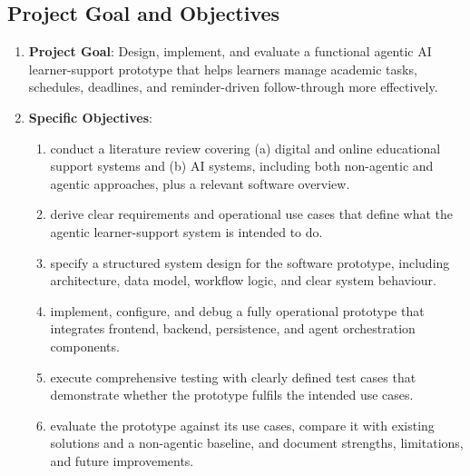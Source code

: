\documentclass[12pt]{article}
\begin{document}
\subsection{Project Goal and Objectives}
\begin{enumerate}
    \item \textbf{Project Goal}: Design, implement, and evaluate a functional agentic AI learner-support prototype that helps learners manage academic tasks, schedules, deadlines, and reminder-driven follow-through more effectively.
    \item \textbf{Specific Objectives}:
    \begin{enumerate}
        \item conduct a literature review covering (a) digital and online educational support systems and (b) AI systems, including both non-agentic and agentic approaches, plus a relevant software overview.
        \item derive clear requirements and operational use cases that define what the agentic learner-support system is intended to do.
        \item specify a structured system design for the software prototype, including architecture, data model, workflow logic, and clear system behaviour.
        \item implement, configure, and debug a fully operational prototype that integrates frontend, backend, persistence, and agent orchestration components.
        \item execute comprehensive testing with clearly defined test cases that demonstrate whether the prototype fulfils the intended use cases.
        \item evaluate the prototype against its use cases, compare it with existing solutions and a non-agentic baseline, and document strengths, limitations, and future improvements.
    \end{enumerate}
\end{enumerate}
\end{document}
